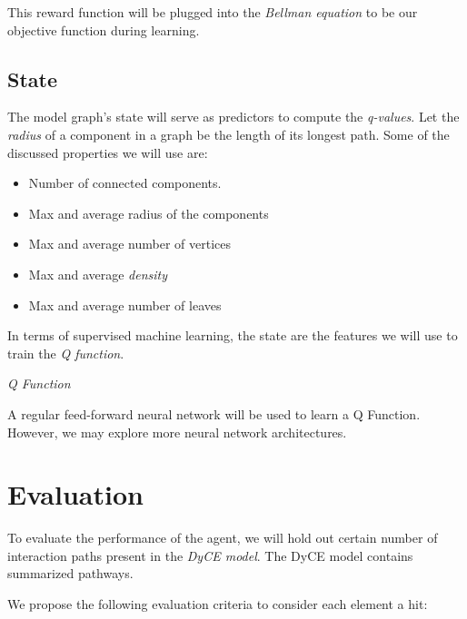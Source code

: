 \documentclass[12pt]{article}
\begin{document}

This reward function will be plugged into the \emph{Bellman equation} to be our objective function during learning.

\subsection{State}

The model graph's state will serve as predictors to compute the \emph{q-values}. Let the \emph{radius} of a component in a graph be the length of its longest path. Some of the discussed properties we will use are:

\begin{itemize}
  \item Number of connected components.
  \item Max and average radius of the components
  \item Max and average number of vertices
  \item Max and average \emph{density}
  \item Max and average number of leaves
\end{itemize}

In terms of supervised machine learning, the state are the features we will use to train the \emph{Q function}.

\emph{Q Function}

A regular feed-forward neural network will be used to learn a Q Function. However, we may explore more neural network architectures.

\section{Evaluation}

To evaluate the performance of the agent, we will hold out certain number of interaction paths present in the \emph{DyCE model}. The DyCE model contains summarized pathways. 

We propose the following evaluation criteria to consider each element a hit:
\end{document}
